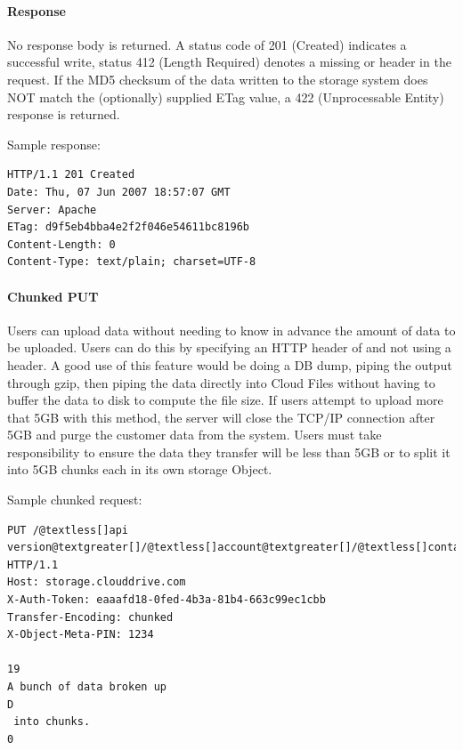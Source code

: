 \documentclass[letterpaper,10pt,english]{manual}
\begin{document}
\paragraph{Response}

No response body is returned. A status code of 201 (Created) indicates
a successful write, status 412 (Length Required) denotes a missing
 or  header in the request. If the
MD5 checksum of the data written to the storage system does NOT match
the (optionally) supplied ETag value, a 422 (Unprocessable Entity)
response is returned.

Sample response:

\begin{Verbatim}[commandchars=@\[\]]
HTTP/1.1 201 Created
Date: Thu, 07 Jun 2007 18:57:07 GMT
Server: Apache
ETag: d9f5eb4bba4e2f2f046e54611bc8196b
Content-Length: 0
Content-Type: text/plain; charset=UTF-8
\end{Verbatim}


\paragraph{Chunked PUT}

Users can upload data without needing to know in advance the amount of
data to be uploaded.  Users can do this by specifying an HTTP header of
 and not using a  header.
A good use of this feature would be doing a DB dump, piping the output
through gzip, then piping the data directly into Cloud Files without
having to buffer the data to disk to compute the file size. If users
attempt to upload more that 5GB with this method, the server will close
the TCP/IP connection after 5GB and purge the customer data from the
system.  Users must take responsibility to ensure the data they transfer
will be less than 5GB or to split it into 5GB chunks each in its own
storage Object.

Sample chunked request:

\begin{Verbatim}[commandchars=@\[\]]
PUT /@textless[]api version@textgreater[]/@textless[]account@textgreater[]/@textless[]container@textgreater[]/@textless[]object@textgreater[] HTTP/1.1
Host: storage.clouddrive.com
X-Auth-Token: eaaafd18-0fed-4b3a-81b4-663c99ec1cbb
Transfer-Encoding: chunked
X-Object-Meta-PIN: 1234

19
A bunch of data broken up
D
 into chunks.
0
\end{Verbatim}
\end{document}

